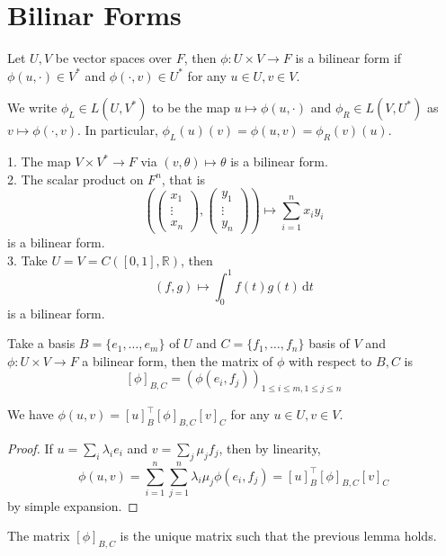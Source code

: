 \section{Bilinar Forms}
\begin{definition}
    Let $U,V$ be vector spaces over $F$, then $\phi:U\times V\to F$ is a bilinear form if $\phi(u,\cdot)\in V^\ast$ and $\phi(\cdot,v)\in U^\ast$ for any $u\in U,v\in V$.
\end{definition}
We write $\phi_L\in L(U,V^\ast)$ to be the map $u\mapsto\phi(u,\cdot)$ and $\phi_R\in L(V,U^\ast)$ as $v\mapsto\phi(\cdot,v)$.
In particular, $\phi_L(u)(v)=\phi(u,v)=\phi_R(v)(u)$.
\begin{example}
    1. The map $V\times V^\ast\to F$ via $(v,\theta)\mapsto \theta$ is a bilinear form.\\
    2. The scalar product on $F^n$, that is
    $$\left( \begin{pmatrix}
        x_1\\
        \vdots\\
        x_n
    \end{pmatrix}, \begin{pmatrix}
        y_1\\
        \vdots\\
        y_n
    \end{pmatrix}\right)\mapsto \sum_{i=1}^nx_iy_i$$
    is a bilinear form.\\
    3. Take $U=V=C([0,1],\mathbb R)$, then
    $$(f,g)\mapsto\int_0^1f(t)g(t)\,\mathrm dt$$
    is a bilinear form.
\end{example}
\begin{definition}
    Take a basis $B=\{e_1,\ldots,e_m\}$ of $U$ and $C=\{f_1,\ldots,f_n\}$ basis of $V$ and $\phi:U\times V\to F$ a bilinear form, then the matrix of $\phi$ with respect to $B,C$ is
    $$[\phi]_{B,C}=(\phi(e_i,f_j))_{1\le i\le m,1\le j\le n}$$
\end{definition}
\begin{lemma}
    We have $\phi(u,v)=[u]_B^\top[\phi]_{B,C}[v]_C$ for any $u\in U,v\in V$.
\end{lemma}
\begin{proof}
    If $u=\sum_i\lambda_ie_i$ and $v=\sum_j\mu_jf_j$, then by linearity,
    $$\phi(u,v)=\sum_{i=1}^n\sum_{j=1}^n\lambda_i\mu_j\phi(e_i,f_j)=[u]_B^\top[\phi]_{B,C}[v]_C$$
    by simple expansion.
\end{proof}
\begin{remark}
    The matrix $[\phi]_{B,C}$ is the unique matrix such that the previous lemma holds.
\end{remark}
